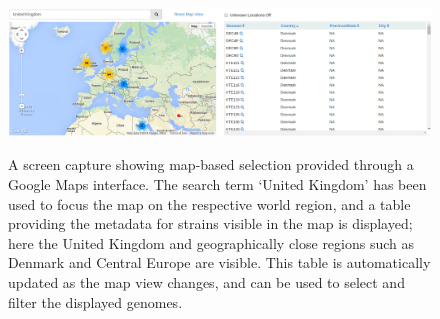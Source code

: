 \documentclass[doublespacing, linenumbers]{bmcart}
\begin{document}
\begin{backmatter}
\newpage
\begin{landscape}
\begin{figure}[h!]
  \includegraphics[width=0.95\columnwidth]{images/uk-map.png}
  \label{fig:map_search}
  \caption{A screen capture showing map-based selection provided through a Google Maps interface.  The search term `United Kingdom' has been used to focus the map on the respective world region, and a table providing the metadata for strains visible in the map is displayed; here the United Kingdom and geographically close regions such as Denmark and Central Europe are visible. This table is automatically updated as the map view changes, and can be used to select and filter the displayed genomes.}
\end{figure}
\end{landscape}



\end{backmatter}
\end{document}
